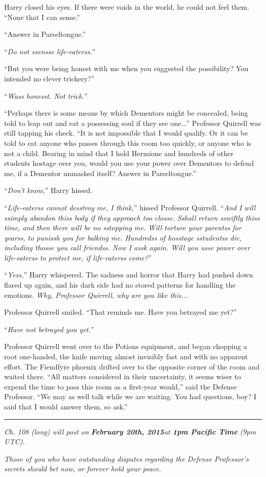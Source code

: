 Harry closed his eyes. If there were voids in the world, he could not feel them. ``None that I can sense.''

``Answer in Parseltongue.''

``\emph{Do not ssensse life-eaterss.}''

``But you were being honest with me when you suggested the possibility? You intended no clever trickery?''

``\emph{Wass honesst. Not trick.}''

``Perhaps there is some means by which Dementors might be concealed, being told to leap out and eat a possessing soul if they see one...'' Professor Quirrell was still tapping his cheek. ``It is not impossible that I would qualify. Or it can be told to eat anyone who passes through this room too quickly, or anyone who is not a child. Bearing in mind that I hold Hermione and hundreds of other students hostage over you, would you use your power over Dementors to defend me, if a Dementor unmasked itself? Answer in Parseltongue.''

``\emph{Don't know,}'' Harry hissed.

``\emph{Life-eaterss cannot desstroy me, I think,}'' hissed Professor Quirrell. ``\emph{And I will ssimply abandon thiss body if they approach too closse. Sshall return sswiftly thiss time, and then there will be no sstopping me. Will torture your parentss for yearss, to punissh you for balking me. Hundredss of hosstage sstudentss die, including thosse you call friendss. Now I assk again. Will you usse power over life-eaterss to protect me, if life-eaterss come?}''

``\emph{Yess,}'' Harry whispered. The sadness and horror that Harry had pushed down flared up again, and his dark side had no stored patterns for handling the emotions. \emph{Why, Professor Quirrell, why are you like this...}

Professor Quirrell smiled. ``That reminds me. Have you betrayed me yet?''

``\emph{Have not betrayed you yet.}''

Professor Quirrell went over to the Potions equipment, and began chopping a root one-handed, the knife moving almost invisibly fast and with no apparent effort. The Fiendfyre phoenix drifted over to the opposite corner of the room and waited there. ``All matters considered in their uncertainty, it seems wiser to expend the time to pass this room as a first-year would,'' said the Defense Professor. ``We may as well talk while we are waiting. You had questions, boy? I said that I would answer them, so ask.''

\begin{center}\rule{3in}{0.4pt}\end{center}

\emph{Ch. 108 (long) will post on} \emph{\textbf{February 20th, 2015}}\emph{at \textbf{1}}\emph{\textbf{pm Pacific Time}} \emph{(9pm UTC).}

\emph{Those of you who have outstanding disputes regarding the Defense Professor's secrets should bet now, or forever hold your peace.}
